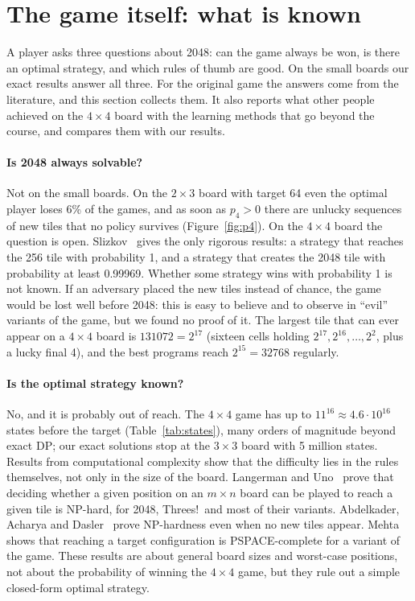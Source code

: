 \documentclass[11pt,a4paper]{article}
\theoremstyle{remark}
\begin{document}
\section{The game itself: what is known}
\label{sec:literature}

A player asks three questions about 2048: can the game always be won, is there an optimal strategy, and which rules of thumb are good. On the small boards our exact results answer all three. For the original game the answers come from the literature, and this section collects them. It also reports what other people achieved on the $4\times4$ board with the learning methods that go beyond the course, and compares them with our results.

\paragraph{Is 2048 always solvable?} Not on the small boards. On the $2\times3$ board with target 64 even the optimal player loses 6\% of the games, and as soon as $p_4>0$ there are unlucky sequences of new tiles that no policy survives (Figure~\ref{fig:p4}). On the $4\times4$ board the question is open. Slizkov~\cite{slizkov2023} gives the only rigorous results: a strategy that reaches the 256 tile with probability 1, and a strategy that creates the 2048 tile with probability at least 0.99969. Whether some strategy wins with probability 1 is not known. If an adversary placed the new tiles instead of chance, the game would be lost well before 2048: this is easy to believe and to observe in ``evil'' variants of the game, but we found no proof of it. The largest tile that can ever appear on a $4\times4$ board is $131072=2^{17}$ (sixteen cells holding $2^{17},2^{16},\dots,2^{2}$, plus a lucky final 4), and the best programs reach $2^{15}=32768$ regularly.

\paragraph{Is the optimal strategy known?} No, and it is probably out of reach. The $4\times4$ game has up to $11^{16}\approx4.6\cdot10^{16}$ states before the target (Table~\ref{tab:states}), many orders of magnitude beyond exact DP; our exact solutions stop at the $3\times3$ board with 5 million states. Results from computational complexity show that the difficulty lies in the rules themselves, not only in the size of the board. Langerman and Uno~\cite{langerman2016} prove that deciding whether a given position on an $m\times n$ board can be played to reach a given tile is NP-hard, for 2048, Threes!\ and most of their variants. Abdelkader, Acharya and Dasler~\cite{abdelkader2016} prove NP-hardness even when no new tiles appear. Mehta~\cite{mehta2014} shows that reaching a target configuration is PSPACE-complete for a variant of the game. These results are about general board sizes and worst-case positions, not about the probability of winning the $4\times4$ game, but they rule out a simple closed-form optimal strategy.
\end{document}
